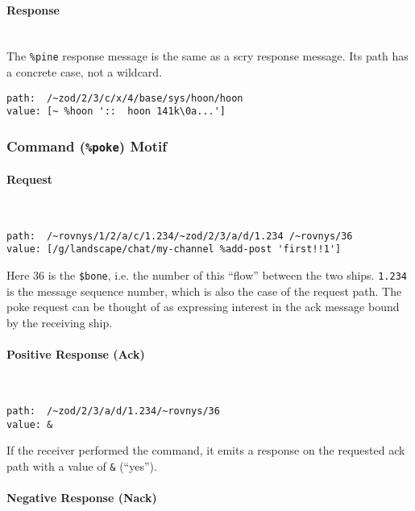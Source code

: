 \documentclass[twoside]{article}
\begin{document}
\paragraph{Response} \mbox{}\\

The \lstinline[style=inlinecode]{%pine} response message is the same as a scry response message. Its path has a concrete case, not a wildcard.

\begin{lstlisting}[style=listingcode]
path:  /~zod/2/3/c/x/4/base/sys/hoon/hoon
value: [~ %hoon '::  hoon 141k\0a...']
\end{lstlisting}

\subsubsection{Command (\texttt{\%poke}) Motif}

\paragraph{Request} \mbox{}\\

\begin{lstlisting}[style=listingcode]
path:  /~rovnys/1/2/a/c/1.234/~zod/2/3/a/d/1.234 /~rovnys/36
value: [/g/landscape/chat/my-channel %add-post 'first!!1']
\end{lstlisting}

Here 36 is the \lstinline[style=inlinecode]{$bone}, i.e. the number of this ``flow'' between the two ships. \lstinline[style=inlinecode]{1.234} is the message sequence number, which is also the case of the request path. The poke request can be thought of as expressing interest in the ack message bound by the receiving ship.

\paragraph{Positive Response (Ack)} \mbox{}\\

\begin{lstlisting}[style=listingcode]
path:  /~zod/2/3/a/d/1.234/~rovnys/36
value: &
\end{lstlisting}

If the receiver performed the command, it emits a response on the requested ack path with a value of \lstinline[style=inlinecode]{&} (``yes'').

\paragraph{Negative Response (Nack)} \mbox{}\\
\end{document}
